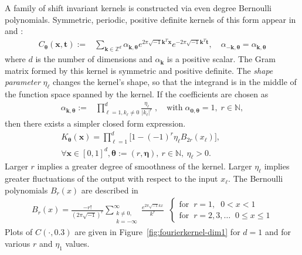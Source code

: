 \documentclass{iitthesis}          %
\newcommand{\bm}[1]{\boldsymbol{#1}}
\newcommand{\naturals}{\mathbb{N}}
\newcommand{\veta}{{\bm{\eta}}}
\newcommand{\vtheta}{{\bm{\theta}}}
\newcommand{\vk}{\bm{k}}
\newcommand{\vt}{\bm{t}}
\newcommand{\vx}{\bm{x}}
\newcommand\figref{Figure~\ref}
\begin{document}
A family of shift invariant kernels is constructed via even degree Bernoulli polynomials. Symmetric, periodic, positive definite kernels of this form appear in  \cite{DicEtal14a} and \cite{Hic96a}:
\begin{align*}
C_\vtheta(\vx, \vt) := &  \sum_{\vk \in \mathbb{Z}^d} \alpha_{\vk,\vtheta}  e^{2 \pi\sqrt{-1} \vk^T\vx}
e^{-2 \pi\sqrt{-1} \vk^T\vt}, \quad \alpha_{-\vk,\vtheta} = \alpha_{\vk,\vtheta}
\end{align*}
where $d$ is the number of dimensions and $\alpha_{\vk}$ is a positive scalar. The Gram matrix formed by this kernel is symmetric and positive definite. 
The \textit{shape parameter} $\eta_\ell$ changes the kernel's shape, so that the integrand is in the middle of the function space spanned by the kernel. 
If the coefficients are chosen as 
\begin{align*}
\alpha_{\vk,\vtheta} := & \prod_{\ell=1, k_\ell \ne 0}^d 
\frac{{\eta_\ell}}{{|k_\ell|^r}}  \;,  \quad \text{with} \; {\alpha}_{\bm{0},\vtheta} = 1, \; r \in \naturals, %
\end{align*}
then there exists a simpler closed form expression.
\begin{multline}
\label{the_kernel_eqn_bernoulli}
K_\vtheta(\vx) =
\prod_{\ell=1}^d \biggl[
1 - (-1)^{r} \eta_\ell B_{2r}( {x_\ell} ) \biggr],  \\
\forall \vx \in [0,1]^d,   \vtheta := (r,\veta), \ r \in \naturals, \ \eta_\ell > 0. \qquad \qquad
\end{multline}
Larger $r$ implies a greater degree of smoothness of the kernel.  Larger $\eta_\ell$ implies greater fluctuations of the output with respect to the input $x_\ell$.  
The Bernoulli polynomials $B_{r}(x)$ are described in \cite[Chapter 24]{OlvEtal10a}
\begin{align*}
B_{r}(x) = \frac{-r!}{(2 \pi \sqrt{-1})^{r}} 
\sum_{\substack{k \neq 0,\\ k=-\infty}}^\infty 
\frac{e^{2\pi\sqrt{-1} k x}}{k^{r}}
\;\;
\begin{cases}
\text{for} \;\; r=1, \;\; 0 < x < 1 \\
\text{for} \;\; r=2,3,\hdots \;\; 0 \leq x \leq 1
\end{cases}
\end{align*}
Plots of $C(\cdot, 0.3)$ are given in \figref{fig:fourierkernel-dim1} for $d=1$ and for various $r$ and $\eta_1$ values.
\end{document}
